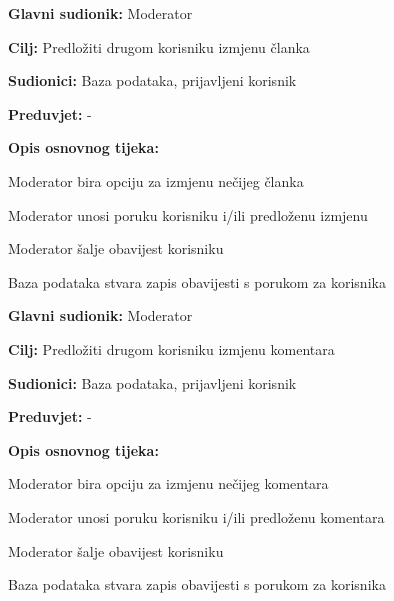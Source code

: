 \noindent {}
\begin{packed_item}

\item \textbf{Glavni sudionik:} Moderator
\item  \textbf{Cilj:} Predložiti drugom korisniku izmjenu članka
\item  \textbf{Sudionici:} Baza podataka, prijavljeni korisnik
\item  \textbf{Preduvjet:} -
\item  \textbf{Opis osnovnog tijeka:}

\item[] \begin{packed_enum}

    \item Moderator bira opciju za izmjenu nečijeg članka
    \item Moderator unosi poruku korisniku i/ili predloženu izmjenu
    \item Moderator šalje obavijest korisniku
    \item Baza podataka stvara zapis obavijesti s porukom za korisnika

\end{packed_enum}

\end{packed_item}

\noindent {}
\begin{packed_item}

\item \textbf{Glavni sudionik:} Moderator
\item  \textbf{Cilj:} Predložiti drugom korisniku izmjenu komentara
\item  \textbf{Sudionici:} Baza podataka, prijavljeni korisnik
\item  \textbf{Preduvjet:} -
\item  \textbf{Opis osnovnog tijeka:}

\item[] \begin{packed_enum}

    \item Moderator bira opciju za izmjenu nečijeg komentara
    \item Moderator unosi poruku korisniku i/ili predloženu komentara
    \item Moderator šalje obavijest korisniku
    \item Baza podataka stvara zapis obavijesti s porukom za korisnika

\end{packed_enum}

\end{packed_item}

